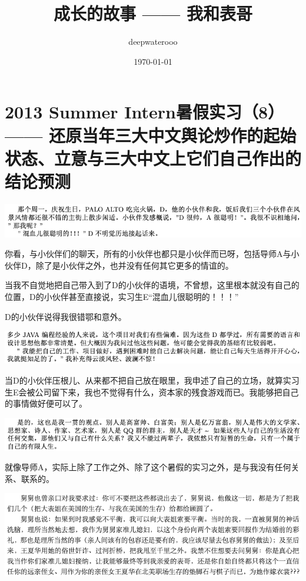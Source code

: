 \documentclass[9pt, b5paper]{article}
\author{deepwaterooo}
\date{\today}
\title{成长的故事 —— 我和表哥}
\begin{document}
\maketitle
\tableofcontents


\section{2013 Summer Intern暑假实习（8）—— 还原当年三大中文舆论炒作的起始状态、立意与三大中文上它们自己作出的结论预测}
\label{sec:orga7f75ca}

\begin{center}
\includegraphics[width=.9\linewidth]{./pic/backups_plans_20210514_121334.png}
\end{center}

你看，与小伙伴们的聊天，所有的小伙伴也都只是小伙伴而已呀，包括导师A与小伙伴D，除了是小伙伴之外，也并没有任何其它更多的情谊的。 

当我不自觉地把自己带入到了D的小伙伴的语境，不曾想，这里根本就没有自己的位置，D的小伙伴甚至直接说，实习生E“混血儿很聪明的！！！”

D的小伙伴说得我很错鄂和意外。 

\begin{center}
\includegraphics[width=.9\linewidth]{./pic/backups_plans_20210514_121704.png}
\end{center}

当D的小伙伴压根儿、从来都不把自己放在眼里，我申述了自己的立场，就算实习生E会被公司留下来，我也不觉得有什么，资本家的残食游戏而已。我能够把自己的事情做好便可以了。 

\begin{center}
\includegraphics[width=.9\linewidth]{./pic/backups_plans_20210514_122038.png}
\end{center}

就像导师A，实际上除了工作之外、除了这个暑假的实习之外，是与我没有任何关系、联系的。

\begin{center}
\includegraphics[width=.9\linewidth]{./pic/backups_plans_20210514_222850.png}
\end{center}
\end{document}
